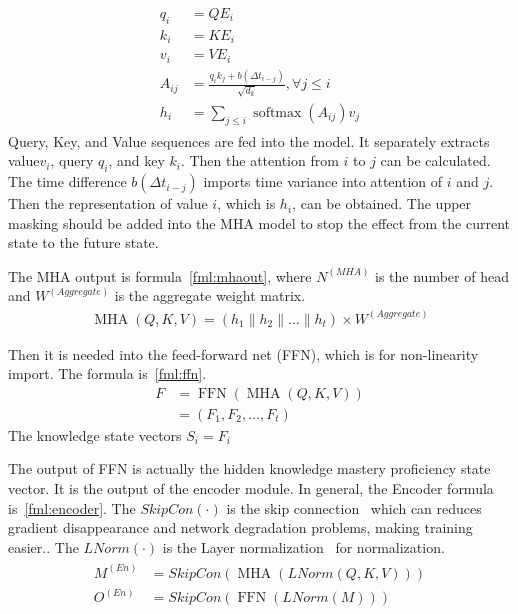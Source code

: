 \begin{align}\label{fml:mha}
    \begin{split}
        q_{i}   & =Q E_i                                                                \\
        k_{i}   & =K E_i                                                                \\
        v_{i}   & =V E_i                                                                \\
        A_{i j} & =\frac{q_{i} k_{j}+b(\Delta t_{i-j})}{\sqrt{d_{k}}}, \forall j \leq i \\
        h_{i}   & =\sum_{j \leq i} \operatorname{softmax}(A_{i j}) v_{j}
    \end{split}
\end{align}
Query, Key, and Value sequences are fed into the model. It separately extracts  value\(v_i\), query \(q_i\), and key \(k_i\). Then the attention from \(i\) to \(j\) can be calculated. The time difference \(b(\Delta t_{i-j})\) imports time variance into attention of \(i\) and \(j\). Then the representation of value \(i\), which is \(h_i\), can be obtained. The upper masking should be added into the MHA model to stop the effect from the current state to the future state.

The MHA output is formula~\ref{fml:mhaout}, where \(N^{(MHA)}\) is the number of head and \(W^{(Aggregate)}\) is the aggregate weight matrix.
\begin{align}
    \operatorname{MHA}(Q,K,V) = (h_1\|h_2\|\ldots \|h_t) \times W^{(Aggregate)}\label{fml:mhaout}
\end{align}

Then it is needed into the feed-forward net (FFN), which is for non-linearity import. The formula is~\ref{fml:ffn}.
\begin{align}\label{fml:ffn}
    F & = \operatorname{FFN}(\operatorname{MHA}(Q,K,V)) \\&=(F_1,F_2,\ldots,F_t)
\end{align}
The knowledge state vectors \(S_i = F_i\)

The output of FFN is actually the hidden knowledge mastery proficiency state vector. It is the output of the encoder module. In general, the Encoder formula is~\ref{fml:encoder}. The \(SkipCon(\cdot)\) is the skip connection~\cite{he2016deep} which can reduces gradient disappearance and network degradation problems, making training easier.. The \(LNorm(\cdot)\) is the Layer normalization~\cite{ba2016layer}
for normalization.
\begin{align}\label{fml:encoder}
    \begin{split}
        M^{(En)} & =SkipCon(\operatorname{MHA}(LNorm(Q,K,V))) \\
        O^{(En)} & =SkipCon(\operatorname{FFN}(LNorm(M)))
    \end{split}
\end{align}

